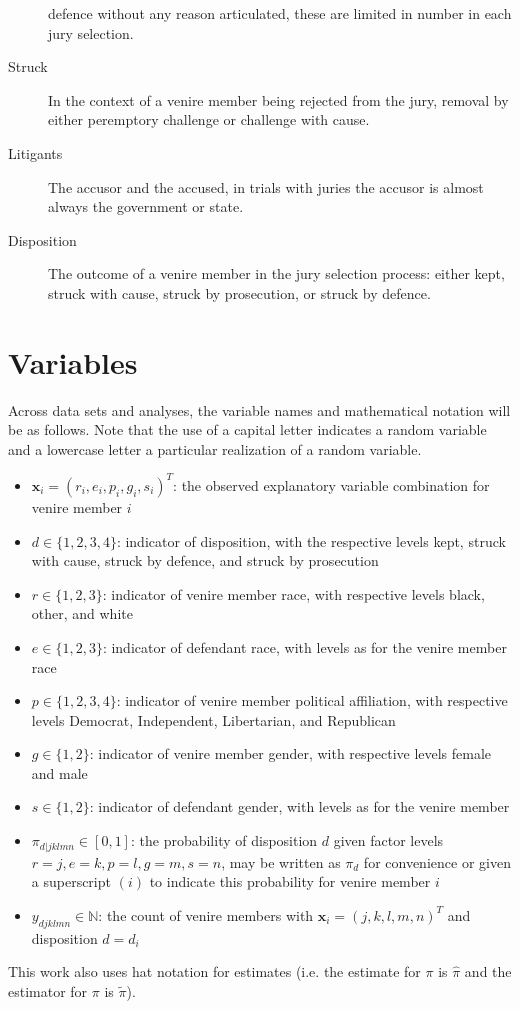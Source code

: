 \begin{description}
  defence without any reason articulated, these are limited in number
  in each jury selection.
\item[Struck] In the context of a venire member being rejected from the jury, removal by either peremptory challenge or challenge
  with cause.
\item[Litigants] The accusor and the accused, in trials with juries the accusor is almost always the government or state.
\item[Disposition] The outcome of a venire member in the jury selection process: either kept, struck with cause, struck by
  prosecution, or struck by defence.
\end{description}

\section*{Variables} \label{not:variables}

Across data sets and analyses, the variable names and mathematical notation will be as follows. Note that the use of a capital
letter indicates a random variable and a lowercase letter a particular realization of a random variable.

\begin{itemize}
\item $\mathbf{x}_i = (r_i,e_i,p_i,g_i,s_i)^T$: the observed explanatory variable combination for venire member $i$
\item $d \in \{1,2,3,4\}$: indicator of disposition, with the respective levels kept, struck with cause, struck by defence,
  and struck by prosecution
\item $r \in \{1,2,3\}$: indicator of venire member race, with respective levels black, other, and white
\item $e \in \{1,2,3\}$: indicator of defendant race, with levels as for the venire member race
\item $p \in \{1,2,3,4\}$: indicator of venire member political affiliation, with respective levels Democrat, Independent,
  Libertarian, and Republican
\item $g \in \{1,2\}$: indicator of venire member gender, with respective levels female and male
\item $s \in \{1,2\}$: indicator of defendant gender, with levels as for the venire member
\item $\pi_{d|jklmn} \in [0,1]$: the probability of disposition $d$ given factor levels $r = j, e = k, p = l, g = m, s = n$, may
  be written as $\pi_d$ for convenience or given a superscript $(i)$ to indicate this probability for venire member $i$
\item $y_{djklmn} \in \mathbb{N}$: the count of venire members with
  $\textbf{x}_i = (j,k,l,m,n)^T$ and disposition $d = d_i$
\end{itemize}

This work also uses hat notation for estimates (i.e. the estimate for $\pi$ is $\hat{\pi}$ and the estimator for $\pi$ is
$\tilde{\pi}$).

